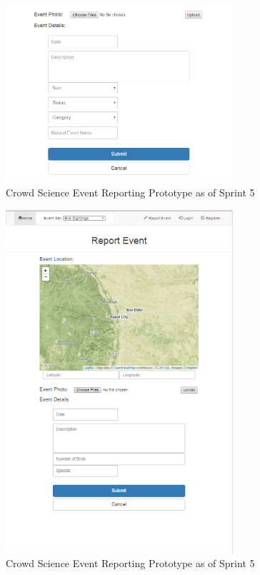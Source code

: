 \begin{figure}[tbh]
\begin{center}
\includegraphics[width=0.75\textwidth]{./figures/prototype_S5_report_2.png}
\end{center}
\caption{Crowd Science Event Reporting Prototype as of Sprint 5\label{prototype_S5_report_2}}
\end{figure}

\begin{figure}[tbh]
\begin{center}
\includegraphics[width=0.75\textwidth]{./figures/prototype_S5_report.png}
\end{center}
\caption{Crowd Science Event Reporting Prototype as of Sprint 5\label{prototype_S5_report}}
\end{figure}

